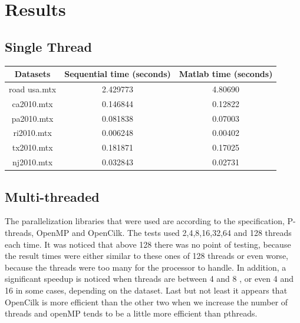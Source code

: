\documentclass[11pt]{article}
\begin{document}
\section{Results}
\label{sec:org9ab3db7}
\subsection{Single Thread}
\label{sec:org755dadf}
\begin{center}
\begin{tabular}{|c|c|c|}
\hline
Datasets & Sequential time (seconds) & Matlab time (seconds)\\[0pt]
\hline
road usa.mtx & 2.429773 & 4.80690\\[0pt]
ca2010.mtx & 0.146844 & 0.12822\\[0pt]
pa2010.mtx & 0.081838 & 0.07003\\[0pt]
ri2010.mtx & 0.006248 & 0.00402\\[0pt]
tx2010.mtx & 0.181871 & 0.17025\\[0pt]
nj2010.mtx & 0.032843 & 0.02731\\[0pt]
\hline
\end{tabular}
\end{center}
\subsection{Multi-threaded}
\label{sec:org8b52f10}
The parallelization libraries that were used are according to the specification, P-threads, OpenMP and OpenCilk. The tests used 2,4,8,16,32,64 and 128 threads each time. It was noticed that above 128 there was no point of testing, because the result times were either similar to these ones of 128 threads or even worse, because the threads were too many for the processor to handle. In addition, a significant speedup is noticed when threads are between 4 and 8 , or even 4 and 16 in some cases, depending on the dataset. Last but not least it appears that OpenCilk is more efficient than the other two when we increase the number of threads and openMP tends to be a little more efficient than pthreads.
\pagebreak
\end{document}
